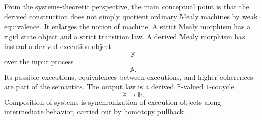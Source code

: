 \begin{remark}
\label{rem:derived-automata-final-summary}
From the systems-theoretic perspective, the main conceptual point is
that the derived construction does not simply quotient ordinary Mealy
machines by weak equivalence. It enlarges the notion of machine. A
strict Mealy morphism has a rigid state object and a strict transition
law. A derived Mealy morphism has instead a derived execution object
\[
\mathbb X
\]
over the input process
\[
\mathbb A.
\]
Its possible executions, equivalences between executions, and higher
coherences are part of the semantics. The output law is a derived
\(\mathbb B\)-valued \(1\)-cocycle
\[
\mathbb X\to\mathbb B.
\]
Composition of systems is synchronization of execution objects along
intermediate behavior, carried out by homotopy pullback.
\end{remark}